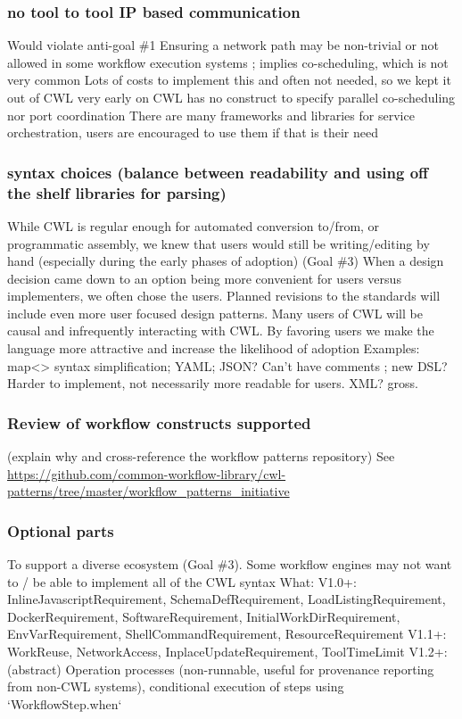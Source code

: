 \subsubsection{no tool to tool IP based communication}
Would violate anti-goal \#1
Ensuring a network path may be non-trivial or not allowed in some workflow execution systems ; implies co-scheduling, which is not very common
Lots of costs to implement this and often not needed, so we kept it out of CWL very early on
CWL has no construct to specify parallel co-scheduling nor port coordination
There are many frameworks and libraries for service orchestration, users are encouraged to use them if that is their need

\subsubsection{syntax choices (balance between readability and using off the shelf libraries for parsing)}
While CWL is regular enough for automated conversion to/from, or programmatic assembly, we knew that users would still be writing/editing by hand (especially during the early phases of adoption) (Goal \#3)
When a design decision came down to an option being more convenient for users versus implementers, we often chose the users. Planned revisions to the standards will include even more user focused design patterns.
Many users of CWL will be causal and infrequently interacting with CWL. By favoring users we make the language more attractive and increase the likelihood of adoption
Examples: map<> syntax simplification; YAML;
JSON? Can’t have comments ; new DSL? Harder to implement, not necessarily more readable for users. XML? gross.

\subsubsection{Review of workflow constructs supported}
(explain why and cross-reference the workflow patterns repository) See \url{https://github.com/common-workflow-library/cwl-patterns/tree/master/workflow_patterns_initiative}

\subsubsection{Optional parts}

To support a diverse ecosystem (Goal \#3). Some workflow engines may not want to / be able to implement all of the CWL syntax
What:
V1.0+: InlineJavascriptRequirement, SchemaDefRequirement, LoadListingRequirement, DockerRequirement, SoftwareRequirement, InitialWorkDirRequirement, EnvVarRequirement, ShellCommandRequirement, ResourceRequirement
V1.1+: WorkReuse, NetworkAccess, InplaceUpdateRequirement, ToolTimeLimit
V1.2+: (abstract) Operation processes (non-runnable, useful for provenance reporting from non-CWL systems), conditional execution of steps using `WorkflowStep.when`

